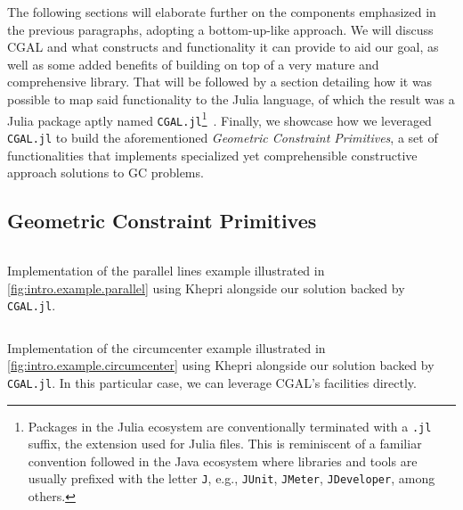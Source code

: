 The following sections will elaborate further on the components emphasized in
the previous paragraphs, adopting a bottom-up-like approach.  We will discuss
\ac{CGAL} and what constructs and functionality it can provide to aid our goal,
as well as some added benefits of building on top of a very mature and
comprehensive library.  That will be followed by a section detailing how it was
possible to map said functionality to the Julia language, of which the result
was a Julia package aptly named \texttt{CGAL.jl}\footnote{Packages in the Julia
ecosystem are conventionally terminated with a \texttt{.jl} suffix, the
extension used for Julia files.  This is reminiscent of a familiar convention
followed in the Java ecosystem where libraries and tools are usually prefixed
with the letter \texttt{J}, e.g., \texttt{JUnit}, \texttt{JMeter},
\texttt{JDeveloper}, among others.}~\cite{Ventura:2019:CGAL.jl}.  Finally, we
showcase how we leveraged \texttt{CGAL.jl} to build the aforementioned
\textit{Geometric Constraint Primitives}, a set of functionalities that implements
specialized yet comprehensible constructive approach solutions to \ac{GC}
problems.




\subsection{Geometric Constraint Primitives}%
\label{sec:solution.impl.gcps}


\begin{listing}[htb]
  \inputminted[highlightlines={5,19}]{julia}{jl/ex_parallel.jl}
  \caption[Parallel lines example using our solution]{
    Implementation of the parallel lines example illustrated in
    \cref{fig:intro.example.parallel} using Khepri alongside our solution
    backed by \texttt{CGAL.jl}.}%
  \label{lst:solution.impl.gcps.parallel}
\end{listing}

\begin{listing}[htb]
  \inputminted[highlightlines={2,19}]{julia}{jl/ex_circumcenter.jl}
  \caption[Circumcenter example using our solution]{
    Implementation of the circumcenter example illustrated in
    \cref{fig:intro.example.circumcenter} using Khepri alongside our solution
    backed by \texttt{CGAL.jl}.  In this particular case, we can leverage
    \ac{CGAL}'s facilities directly.}%
  \label{lst:solution.impl.gcps.circumcenter}
\end{listing}
